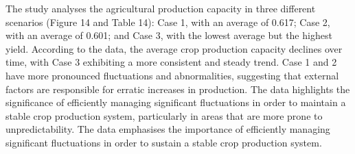 \documentclass[final,5p,times,twocolumn,authoryear]{elsarticle}
\begin{document}
\begin{table}[htbp]
    \centering
    \caption{Crop Production Capacity - Statistical Analysis}
\end{table}
The study analyses the agricultural production capacity in three different scenarios (Figure 14 and Table 14): Case 1, with an average of 0.617; Case 2, with an average of 0.601; and Case 3, with the lowest average but the highest yield. According to the data, the average crop production capacity declines over time, with Case 3 exhibiting a more consistent and steady trend. Case 1 and 2 have more pronounced fluctuations and abnormalities, suggesting that external factors are responsible for erratic increases in production. The data highlights the significance of efficiently managing significant fluctuations in order to maintain a stable crop production system, particularly in areas that are more prone to unpredictability. The data emphasises the importance of efficiently managing significant fluctuations in order to sustain a stable crop production system.\\
\FloatBarrier
\end{document}
